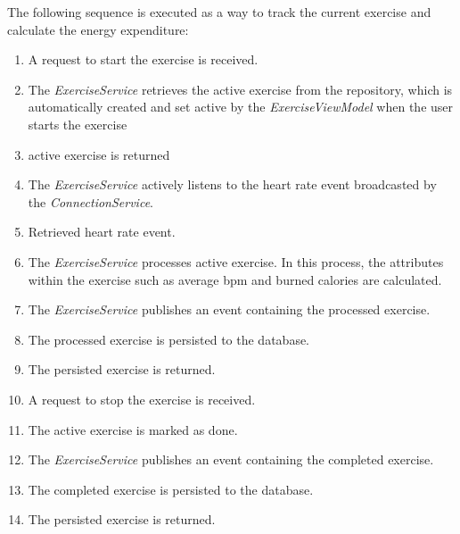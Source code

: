 The following sequence is executed as a way to track the current exercise and calculate the energy expenditure:
\begin{enumerate}
    \item A request to start the exercise is received.
    \item The \emph{ExerciseService} retrieves the active exercise from the repository, which is automatically created and set active by the \emph{ExerciseViewModel} when the user starts the exercise
    \item active exercise is returned
    \item The \emph{ExerciseService} actively listens to the heart rate event broadcasted by the \emph{ConnectionService}.
    \item Retrieved heart rate event.
    \item The \emph{ExerciseService} processes active exercise. In this process, the attributes within the exercise such as average bpm and burned calories are calculated.
    \item The \emph{ExerciseService} publishes an event containing the processed exercise.
    \item The processed exercise is persisted to the database.
    \item The persisted exercise is returned.
    \item A request to stop the exercise is received.
    \item The active exercise is marked as done.
    \item The \emph{ExerciseService} publishes an event containing the completed exercise.
    \item The completed exercise is persisted to the database.
    \item The persisted exercise is returned.
\end{enumerate}

